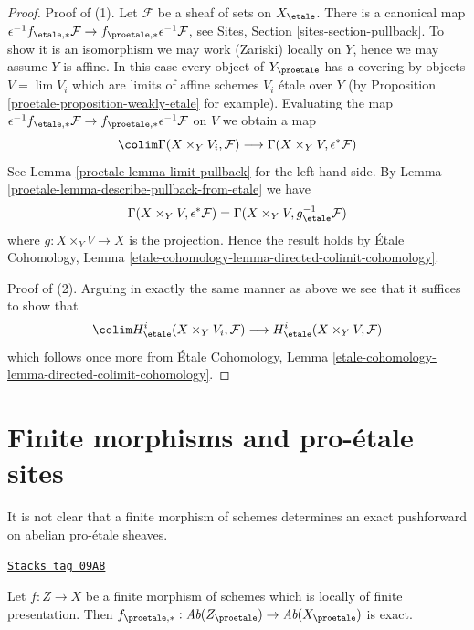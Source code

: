 \begin{proof}

Proof of (1). Let $\mathcal{F}$ be a sheaf of sets on $X_\etale$. There
is a canonical map $\epsilon^{-1}f_{\etale, *}\mathcal{F} \to
f_{\proetale, *}\epsilon^{-1}\mathcal{F}$, see
Sites, Section \ref{sites-section-pullback}.
To show it is an isomorphism we may work (Zariski) locally on $Y$, hence
we may assume $Y$ is affine. In this case
every object of $Y_\proetale$ has a covering by objects $V = \lim V_i$
which are limits of affine schemes $V_i$ \'etale over $Y$ (by
Proposition \ref{proetale-proposition-weakly-etale}
for example). Evaluating the map
$\epsilon^{-1}f_{\etale, *}\mathcal{F} \to
f_{\proetale, *}\epsilon^{-1}\mathcal{F}$
on $V$ we obtain a map
$$
\colim \Gamma(X \times_Y V_i, \mathcal{F})
\longrightarrow
\Gamma(X \times_Y V, \epsilon^*\mathcal{F})
$$
See Lemma \ref{proetale-lemma-limit-pullback} for the left hand side.
By Lemma \ref{proetale-lemma-describe-pullback-from-etale} we have
$$
\Gamma(X \times_Y V, \epsilon^*\mathcal{F}) =
\Gamma(X \times_Y V, g_\etale^{-1}\mathcal{F})
$$
where $g : X \times_Y V \to X$ is the projection. Hence the result holds by
\'Etale Cohomology, Lemma
\ref{etale-cohomology-lemma-directed-colimit-cohomology}.

\medskip\noindent
Proof of (2). Arguing in exactly the same manner as above
we see that it suffices to show that
$$
\colim H^i_\etale(X \times_Y V_i, \mathcal{F})
\longrightarrow
H^i_\etale(X \times_Y V, \mathcal{F})
$$
which follows once more from \'Etale Cohomology, Lemma
\ref{etale-cohomology-lemma-directed-colimit-cohomology}.
\end{proof}

\section{Finite morphisms and pro-\'etale sites}
\label{proetale-section-finite}
It is not clear that a finite morphism of schemes determines
an exact pushforward on abelian pro-\'etale sheaves.

\begin{lemma}[Finite]
\label{proetale-lemma-finite}
\href{https://stacks.math.columbia.edu/tag/09A8}{\texttt{Stacks tag 09A8}}

Let $f : Z \to X$ be a finite morphism of schemes which is
locally of finite presentation. Then
$f_{\proetale, *} : \textit{Ab}(Z_\proetale) \to \textit{Ab}(X_\proetale)$
is exact.
\end{lemma}

